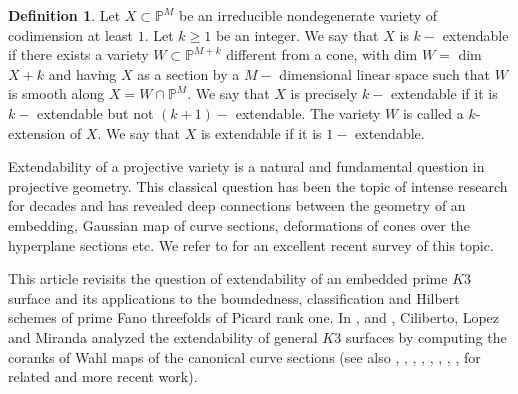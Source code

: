 \documentclass[11pt,twoside]{amsart}
\theoremstyle{plain}
\theoremstyle{definition}
\newtheorem{definition}[theorem]{Definition}
\begin{document}
\begin{definition}\label{extendability}
Let $X \subset \mathbb{P}^M$ be an irreducible nondegenerate variety of codimension at least $1$. Let $k \geq 1$ be an integer. We say that $X$ is $k-$ extendable if there exists a variety $W \subset \mathbb{P}^{M+k}$
different from a cone, with dim $W =$ dim $X + k$ and having $X$ as a section by a $M-$ dimensional linear space such that $W$ is smooth along $X = W \cap \mathbb{P}^M$. We say that $X$ is precisely $k-$ extendable if it is $k-$ extendable but not $(k + 1)-$ extendable. The variety $W$ is called a $k$-extension of $X$. We say that $X$ is extendable if it is $1-$ extendable.
\end{definition}

Extendability of a projective variety is a natural and fundamental question in projective geometry. This classical question has been the topic of intense research for decades and has revealed deep connections between the geometry of an embedding, Gaussian map of curve sections, deformations of cones over the hyperplane sections etc. We refer to \cite{Lop23} for an excellent recent survey of this topic.

\smallskip

This article revisits the question of extendability of an embedded prime $K3$ surface and its applications to the boundedness, classification and Hilbert schemes of prime Fano threefolds of Picard rank one. In \cite{CLM93}, \cite{CLM94} and \cite{CLM98}, Ciliberto, Lopez and Miranda analyzed the extendability of general $K3$ surfaces by computing the coranks of Wahl maps of the canonical curve sections (see also \cite{ABS17}, \cite{CD22}, \cite{CD24}, \cite{CDGK20}, \cite{CDS20}, \cite{K01}, \cite{K20}, \cite{KLM11}, \cite{Tot20} for related and more recent work). 
\end{document}
